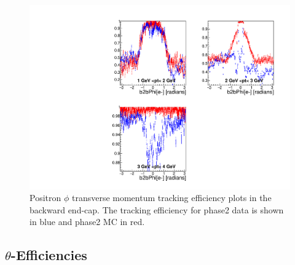 \documentclass[a4paper,11pt,twosided,final,german,openbib,pdftex,listof=totoc,bibliography=totoc]{scrbook}
\begin{document}
\begin{figure}[!htbp]
	\centering
	\includegraphics[width=\textwidth]{Plots/master/xPtMPhiepEC}
	\caption[Transverse Momentum $\phi$ Positron Backward End-Cap Efficiency Phase2]{Positron $\phi$ transverse momentum tracking efficiency plots in the backward end-cap. The tracking efficiency for phase2 data is shown in blue and phase2 MC in red.
		\label{plt:xPtMPhiepEC}	}
\end{figure}

\newpage

\subsection{$\theta$-Efficiencies}
\end{document}
